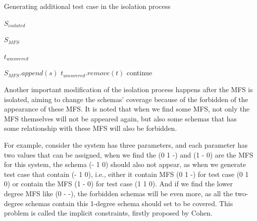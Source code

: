 \documentclass{sig-alternate}
\begin{document}
\begin{algorithm}
  \caption{Generating additional test case in the isolation process}
  \begin{algorithmic}[1]
     \Require

     $S_{isolated}$ 


     $S_{MFS}$ 

     $t_{uncovered}$ 




       \State $S_{MFS}.append(s)$
     \EndFor
         \State  $t_{uncovered}.remove(t)$
       \Else
         \State continue
       \EndIf
     \EndFor
%
  \end{algorithmic}
\end{algorithm}
 
 
 Another important modification of the isolation process happens after the MFS is isolated, aiming to change the schemas' coverage because of the forbidden of the appearance of these MFS. It is noted that when we find some MFS, not only the MFS themselves will not be appeared again, but also some schemas that has some relationship with these MFS will also be forbidden.

For example, consider the system has three parameters, and each parameter has two values that can be assigned, when we find the (0 1 -) and (1 - 0) are the MFS for this system, the schema (- 1 0) should also not appear, as when we generate test case that contain (- 1 0), i.e., either it contain MFS (0 1 -) for test case (0 1 0) or contain the MFS (1 - 0) for test case (1 1 0). And if we find the lower degree MFS like (0 - -), the forbidden schemas will be even more, as all the two-degree schemas contain this 1-degree schema should set to be covered. This problem is called the implicit constraints, firstly proposed by Cohen.
\end{document}
